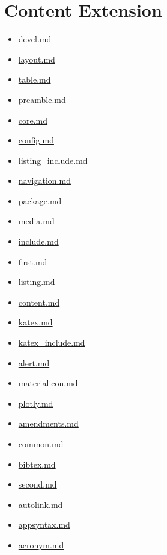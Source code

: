 
\chapter{\label{content-extension}Content Extension}
\begin{itemize}
\item\href{devel.tex}{devel.md}\item\href{layout.tex}{layout.md}\item\href{table.tex}{table.md}\item\href{preamble.tex}{preamble.md}\item\href{core.tex}{core.md}\item\href{config.tex}{config.md}\item\href{listing\_include.tex}{listing\_include.md}\item\href{navigation.tex}{navigation.md}\item\href{package.tex}{package.md}\item\href{media.tex}{media.md}\item\href{include.tex}{include.md}\item\href{first.tex}{first.md}\item\href{listing.tex}{listing.md}\item\href{content.tex}{content.md}\item\href{katex.tex}{katex.md}\item\href{katex\_include.tex}{katex\_include.md}\item\href{alert.tex}{alert.md}\item\href{materialicon.tex}{materialicon.md}\item\href{plotly.tex}{plotly.md}\item\href{amendments.tex}{amendments.md}\item\href{common.tex}{common.md}\item\href{bibtex.tex}{bibtex.md}\item\href{second.tex}{second.md}\item\href{autolink.tex}{autolink.md}\item\href{appsyntax.tex}{appsyntax.md}\item\href{acronym.tex}{acronym.md}
\end{itemize}